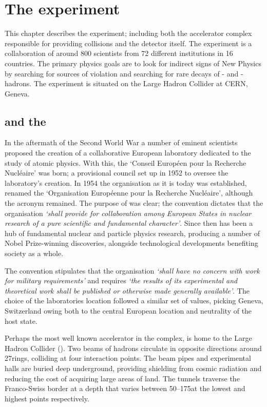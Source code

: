 \chapter{The \lhcb experiment} 
\label{ch:detector}
\minitoc


This chapter describes the \lhcb experiment; including both the accelerator complex responsible for providing \proton\proton collisions and the \lhcb detector itself.  
The \lhcb experiment is a collaboration of around 800 scientists from 72 different institutions in 16 countries. The primary physics goals are to look for indirect signs of New Physics by searching for sources of \CP violation and searching for rare decays of \bquark- and \cquark-hadrons. The experiment is situated on the Large Hadron Collider at CERN, Geneva. 



\section{\cern and the \lhc}


In the aftermath of the Second World War a number of eminent scientists proposed the creation of a collaborative European laboratory dedicated to the study of atomic physics. With this, the `Conseil Europ\'een pour la Recherche Nucl\'eaire' was born; a provisional council set up in 1952 to oversee the laboratory's creation.  In 1954 the organisation as it is today was established, renamed the `Organisation Europ\'eenne pour la Recherche Nucl\'eaire', although the acronym \cern remained. 
The purpose of \cern was clear; the convention dictates that the organisation \emph{`shall provide for collaboration among European States in nuclear research of a pure scientific and fundamental character'}.
Since then \cern has been a hub of fundamental nuclear and particle physics research, producing a number of Nobel Prize-winning discoveries, alongside technological developments benefiting society as a whole.

The convention stipulates that the organisation \emph{`shall have no concern with work for military requirements'} and  
requires \emph{`the results of its experimental and theoretical work shall be published or otherwise made generally available'}. 
The choice of the laboratories location followed a similar set of values, picking Geneva, Switzerland owing both to the central European location and neutrality of the host state. 


Perhaps the most well known accelerator in the complex, \cern is home to the Large Hadron Collider (\lhc). Two beams of hadrons circulate in opposite directions around 27\km rings, colliding at four interaction points. The beam pipes and experimental halls are buried deep underground, providing shielding from cosmic radiation and reducing the cost of acquiring large areas of land. The tunnels traverse the Franco-Swiss border at a depth that varies between 50--175\m at the lowest and highest points respectively.      

